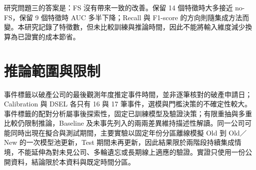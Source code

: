 研究問題三的答案是：FS 沒有帶來一致的改善。保留 14 個特徵時大多接近 no-FS，保留 9 個特徵時 AUC 多半下降；Recall 與 F1-score 的方向則隨集成方法而變。本研究記錄了特徵數，但未比較訓練與推論時間，因此不能將輸入維度減少換算為已證實的成本節省。

\section{推論範圍與限制}

事件標籤以破產公司的最後觀測年度推定事件時間，並非逐筆核對的破產申請日；Calibration 與 DSEL 各只有 16 與 17 筆事件，選模與門檻決策的不確定性較大。事件標籤的配對分析屬事後探索性，固定已訓練模型及驗證決策；有限重抽與多重比較仍限制推論，Baseline 及未事先列入的兩兩差異維持描述性解讀。同一公司可能同時出現在擬合與測試期間，主要實驗以固定年份分區離線模擬 Old 到 Old／New 的一次模型池更新，Test 期間未再更新，因此結果限於兩階段持續集成情境，不能延伸為對未見公司、多輪遺忘或長期線上適應的驗證。實證只使用一份公開資料，結論限於本資料與既定時間分區。
\endgroup
